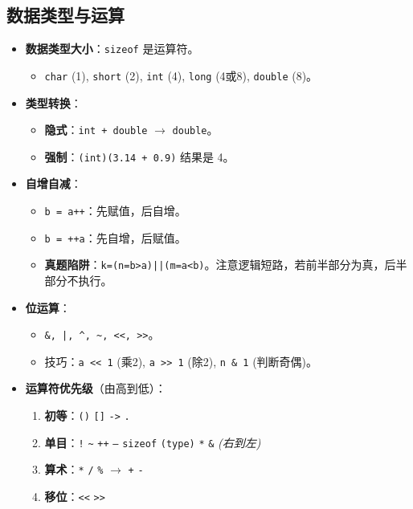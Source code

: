 \documentclass[a4paper,12pt]{article}
\begin{document}
\subsection{数据类型与运算}
\label{sec:data_types}
\begin{itemize}
    \item \textbf{数据类型大小}：\texttt{sizeof} 是运算符。
    \begin{itemize}
        \item \texttt{char} (1), \texttt{short} (2), \texttt{int} (4), \texttt{long} (4或8), \texttt{double} (8)。
    \end{itemize}
    \item \textbf{类型转换}：
    \begin{itemize}
        \item \textbf{隐式}：\texttt{int + double} $\rightarrow$ \texttt{double}。
        \item \textbf{强制}：\texttt{(int)(3.14 + 0.9)} 结果是 4。
    \end{itemize}
    \item \textbf{自增自减}：
    \begin{itemize}
        \item \texttt{b = a++}：先赋值，后自增。
        \item \texttt{b = ++a}：先自增，后赋值。
        \item \textbf{真题陷阱}：\texttt{k=(n=b>a)||(m=a<b)}。注意逻辑短路，若前半部分为真，后半部分不执行。
    \end{itemize}
    \item \textbf{位运算}：
    \begin{itemize}
        \item \texttt{\&, |, \^{}, \~{}, <<, >>}。
        \item 技巧：\texttt{a << 1} (乘2), \texttt{a >> 1} (除2), \texttt{n \& 1} (判断奇偶)。
    \end{itemize}
    \item \textbf{运算符优先级}（由高到低）：
    \begin{enumerate}
        \item \textbf{初等}：\texttt{()} \texttt{[]} \texttt{->} \texttt{.}
        \item \textbf{单目}：\texttt{!} \texttt{\~} \texttt{++} \texttt{--} \texttt{sizeof} \texttt{(type)} \texttt{*} \texttt{\&} \hfill \textit{(右到左)}
        \item \textbf{算术}：\texttt{*} \texttt{/} \texttt{\%} $\rightarrow$ \texttt{+} \texttt{-}
        \item \textbf{移位}：\texttt{<<} \texttt{>>}

\end{enumerate}
\end{itemize}
\end{document}
